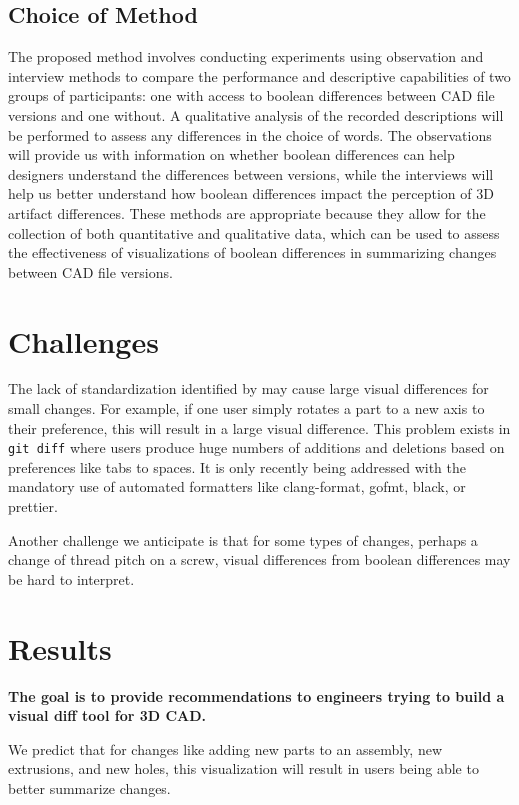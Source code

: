 \documentclass[sigconf,authorversion,nonacm]{acmart}
\begin{document}
\subsection{Choice of Method}
The proposed method involves conducting experiments using observation and interview methods to compare the performance and descriptive capabilities of two groups of participants: one with access to boolean differences between CAD file versions and one without. A qualitative analysis of the recorded descriptions will be performed to assess any differences in the choice of words. The observations will provide us with information on whether boolean differences can help designers understand the differences between versions, while the interviews will help us better understand how boolean differences impact the perception of 3D artifact differences. These methods are appropriate because they allow for the collection of both quantitative and qualitative data, which can be used to assess the effectiveness of visualizations of boolean differences in summarizing changes between CAD file versions.
\section{Challenges}

The lack of standardization identified by \citet{cheng2023age} may cause large visual differences for small changes.
For example, if one user simply rotates a part to a new axis to their preference, this will result in a large visual difference.
This problem exists in \texttt{git diff} where users produce huge numbers of additions and deletions based on preferences like tabs to spaces.
It is only recently being addressed with the mandatory use of automated formatters like clang-format, gofmt, black, or prettier.

Another challenge we anticipate is that for some types of changes, perhaps a change of thread pitch on a screw, visual differences from boolean differences may be hard to interpret.

\section{Results}

\textbf{The goal is to provide recommendations to engineers trying to build a visual diff tool for 3D CAD.}

We predict that for changes like adding new parts to an assembly, new extrusions, and new holes, this visualization will result in users being able to better summarize changes.
\end{document}
